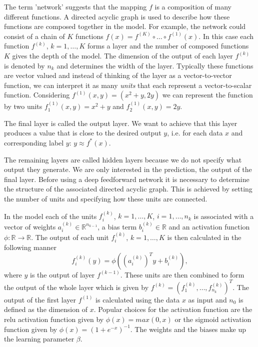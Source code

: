 \documentclass[12pt, a4paper]{scrartcl}
\theoremstyle{definition}
\theoremstyle{plain}
\numberwithin{equation}{section}
\numberwithin{figure}{section}
\numberwithin{table}{section}
\begin{document}
	The term 'network' suggests that the mapping $f$ is a composition of many different functions.
	A directed acyclic graph is used to describe how these functions are composed together in the model.
	For example, the network could consist of a chain of $K$ functions $ f(x) = f^{(K)}\circ \dots \circ f^{(1)}(x)$.
	In this case each function $f^{(k)}$, $k=1,\dots,K$ forms a layer and the number of composed functions $K$ gives the depth of the model.
	The dimension of the output of each layer $f^{(k)}$ is denoted by $n_k$ and determines the width of the layer.
	Typically these functions are vector valued and instead of thinking of the layer as a vector-to-vector function, we can interpret it as many \emph{units} that each represent a vector-to-scalar function.
	Considering $f^{(1)}(x,y)= (x^2+y,2y)$ we can represent the function by two units $f^{(1)}_1 (x,y) = x^2+y$ and $f^{(1)}_2(x,y) = 2y$.
	
	The final layer is called the output layer.
	We want to achieve that this layer produces a value that is close to the desired output $y$, i.e. for each data $x$ and corresponding label $y$: $y \approx f^*(x)$.
	
	The remaining layers are called hidden layers because we do not specify what output they generate.
	We are only interested in the prediction, the output of the final layer.
	Before using a deep feedforward network it is necessary to determine the structure of the associated directed acyclic graph.
	This is achieved by setting the number of units and specifying how these units are connected.
	
	In the model each of the units $f^{(k)}_i$, $k=1,\dots,K$, $i = 1,\dots,n_{k}$ is associated with a vector of weights $a^{(k)}_i \in \mathbb{R}^{n_{k-1}}$, a bias term $b^{(k)}_i\in \mathbb{R}$ and an activation function $\phi: \mathbb{R} \to \mathbb{R}$.
	The output of each unit $f^{(k)}_i$, $k=1,\dots,K$ is then calculated in the following manner
	\begin{equation*}
	f_i^{(k)}(y) = \phi \left(\left(a^{(k)}_i\right)^Ty + b^{(k)}_i\right),
	\end{equation*}
	where $y$ is the output of layer $f^{(k-1)}$.
	These units are then combined to form the output of the whole layer which is given by $f^{(k)} = \left(f^{(k)}_1,\dots, f^{(k)}_{n_k}\right)^T$.
	The output of the first layer $f^{(1)}$ is calculated using the data $x$ as input and $n_0$ is defined as the dimension of $x$.
	Popular choices for the activation function are the relu activation function given by $\phi(x) = max(0,x)$ or the sigmoid activation function given by $\phi(x) = (1+e^{-x})^{-1}$.
	The weights and the biases make up the learning parameter $\beta$.
	
\end{document}
